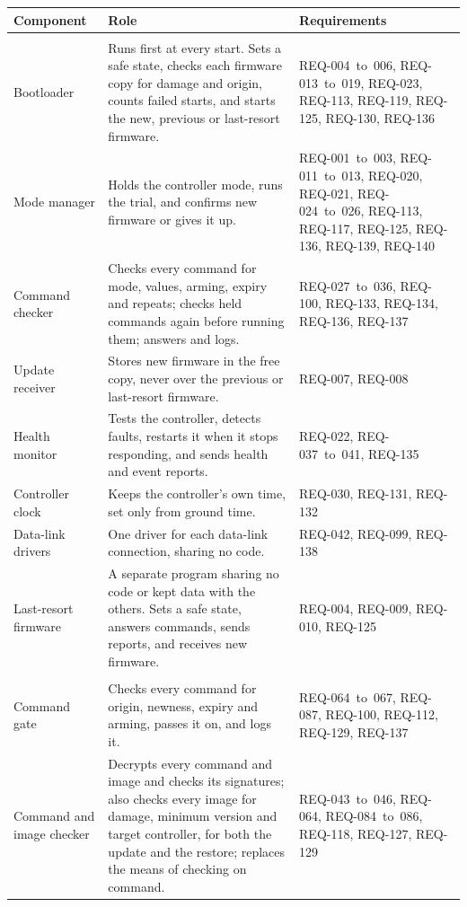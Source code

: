 \documentclass[11pt,a4paper]{article}
\begin{document}
{\footnotesize
\begin{xltabular}{\textwidth}{@{}>{\raggedright\arraybackslash}p{2.9cm}>{\raggedright\arraybackslash}X>{\raggedright\arraybackslash}p{3.6cm}@{}}
\toprule
Component & Role & Requirements \\
\midrule
\endhead
{} \\
Bootloader & Runs first at every start. Sets a safe state, checks each firmware copy for damage and origin, counts failed starts, and starts the new, previous or last-resort firmware. & REQ-004~to~006, REQ-013~to~019, REQ-023, REQ-113, REQ-119, REQ-125, REQ-130, REQ-136 \\
Mode manager & Holds the controller mode, runs the trial, and confirms new firmware or gives it up. & REQ-001~to~003, REQ-011~to~013, REQ-020, REQ-021, REQ-024~to~026, REQ-113, REQ-117, REQ-125, REQ-136, REQ-139, REQ-140 \\
Command checker & Checks every command for mode, values, arming, expiry and repeats; checks held commands again before running them; answers and logs. & REQ-027~to~036, REQ-100, REQ-133, REQ-134, REQ-136, REQ-137 \\
Update receiver & Stores new firmware in the free copy, never over the previous or last-resort firmware. & REQ-007, REQ-008 \\
Health monitor & Tests the controller, detects faults, restarts it when it stops responding, and sends health and event reports. & REQ-022, REQ-037~to~041, REQ-135 \\
Controller clock & Keeps the controller's own time, set only from ground time. & REQ-030, REQ-131, REQ-132 \\
Data-link drivers & One driver for each data-link connection, sharing no code. & REQ-042, REQ-099, REQ-138 \\
Last-resort firmware & A separate program sharing no code or kept data with the others. Sets a safe state, answers commands, sends reports, and receives new firmware. & REQ-004, REQ-009, REQ-010, REQ-125 \\
 \\
Command gate & Checks every command for origin, newness, expiry and arming, passes it on, and logs it. & REQ-064~to~067, REQ-087, REQ-100, REQ-112, REQ-129, REQ-137 \\
Command and image checker & Decrypts every command and image and checks its signatures; also checks every image for damage, minimum version and target controller, for both the update and the restore; replaces the means of checking on command. & REQ-043~to~046, REQ-064, REQ-084~to~086, REQ-118, REQ-127, REQ-129 \\

\end{xltabular}}
\end{document}
